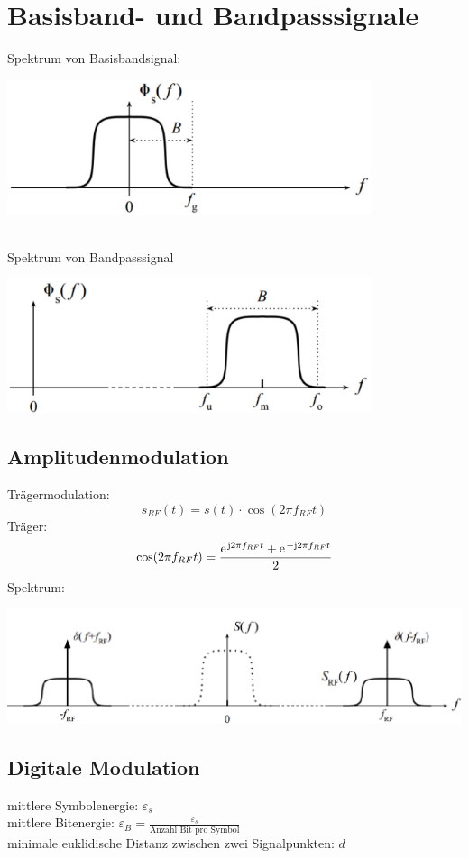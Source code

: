 \chapter{Basisband- und Bandpasssignale}
Spektrum von Basisbandsignal:
\begin{center}
	\includegraphics[width=0.8\textwidth]{../fig/spek_basis}
\end{center}
~\\
Spektrum von Bandpasssignal
\begin{center}
	\includegraphics[width=0.8\textwidth]{../fig/spek_bandp}
\end{center}

\section{Amplitudenmodulation}
Trägermodulation:
\[
	s_{RF}(t) = s(t) \cdot \cos(2\pi f_{RF} t)
\]
Träger:
\[
	\cos(2\pi f_{RF} t)	= \frac{\e^{\im 2 \pi f_{RF} t} + \e^{-\im 2 \pi f_{RF} t}}{2}
\]
Spektrum:
\begin{center}
	\includegraphics[width=.8\textwidth]{../fig/spek_band.png}
\end{center}

\section{Digitale Modulation}
mittlere Symbolenergie: $\varepsilon_s$ \\
mittlere Bitenergie: $ \varepsilon_B = \frac{\varepsilon_s}{\textrm{Anzahl Bit pro Symbol}} $ \\
minimale euklidische Distanz zwischen zwei Signalpunkten: $ d $

